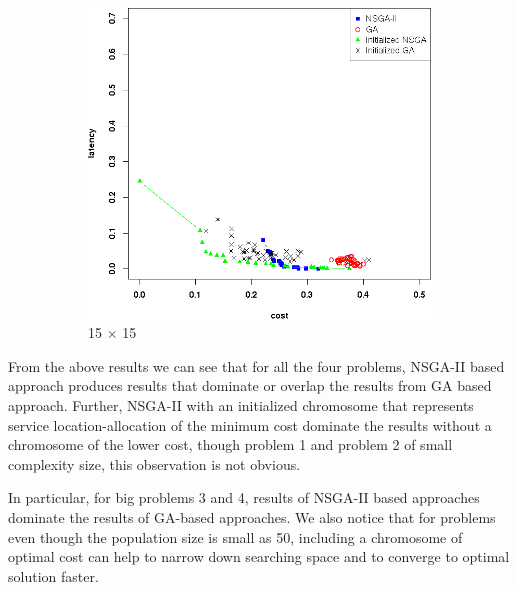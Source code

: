 \documentclass{llncs}
\begin{document}
\begin{figure}[H]
\begin{subfigure}[b]{0.45\textwidth}
	\end{subfigure}
	\begin{subfigure}[b]{0.45\textwidth}
		\includegraphics[width=\textwidth]{pics/pop_50_gen_50_15_times_15_sufficient_initialisation.png}
		\caption{15 $\times$ 15}
	\end{subfigure}
	\caption{}\label{fig:c1}
\end{figure}

From the above results we can see that for all the four problems, NSGA-II based approach produces results that dominate or overlap the results from GA based approach. Further,
NSGA-II with an initialized chromosome that represents service location-allocation of the minimum cost dominate the results without a chromosome of the lower cost, though problem 1 and
problem 2 of small complexity size, this observation is not obvious.

In particular, for big problems 3 and 4, results of NSGA-II based approaches dominate the results of GA-based approaches. We also notice that for problems even though the population size
is small as 50, including a chromosome of optimal cost can help to narrow down searching space and to converge to optimal solution faster.

\end{document}
